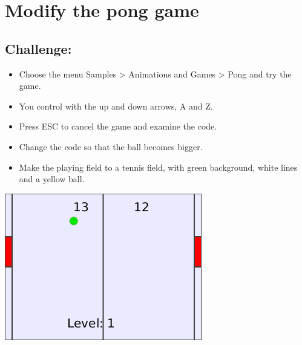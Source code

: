 \chapter{Modify the pong game}
\begin{multicols}{2}
\section*{\color{BrickRed}Challenge:}


\begin{itemize}

\item {Choose the menu Samples > Animations and Games > Pong and try the game.}
\item {You control with the up and down arrows,  A and Z.}
\item {Press ESC to cancel the game and examine the code.}
\item {Change the code so that the ball becomes bigger.}
\item {Make the playing field to a tennis field, with green background, white lines and a yellow ball.}

\end{itemize}



\columnbreak

\begin{center}
\includegraphics{../img/pong.png}
\end{center}

\end{multicols}

